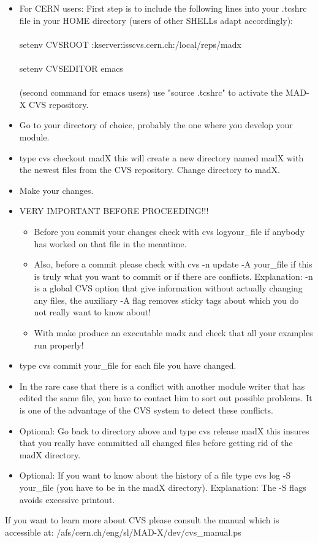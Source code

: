 \begin{itemize}
\begin{itemize}
	\item  For CERN users: First step is to include the following lines into your .tcshrc file in your HOME directory (users of other SHELLs adapt accordingly): 
\\
\\
 setenv CVSROOT :kserver:isscvs.cern.ch:/local/reps/madx 
 \\
 \\
 setenv CVSEDITOR emacs 
 \\
 \\
 (second command for emacs users) use "source .tcshrc" to activate the MAD-X CVS repository. 
	\item  Go to your directory of choice, probably the one where you develop your module. 
	\item  type cvs checkout madX this will create a new directory named madX with the newest files from the CVS repository. Change directory to madX. 
	\item  Make your changes. 
	\item VERY IMPORTANT BEFORE PROCEEDING!!! 
\begin{itemize}
	\item  Before you commit your changes check with cvs logyour\_file if anybody has worked on that file in the meantime. 
	\item  Also, before a commit please check with cvs -n update -A your\_file if this is truly what you want to commit or if there are conflicts. Explanation: -n is a global CVS option that give information without actually changing any files, the auxiliary -A flag removes sticky tags about which you do not really want to know about! 
	\item  With make produce an executable madx and check that all your examples run properly! 
\end{itemize}
	\item  type cvs commit your\_file for each file you have changed.  
	\item  In the rare case that there is a conflict with another module writer that has edited the same file, you have to contact him to sort out possible problems. It is one of the advantage of the CVS system to detect these conflicts. 
	\item  Optional: Go back to directory above and type cvs release madX  this insures that you really have committed all changed files before getting rid of the madX directory. 
	\item  Optional: If you want to know about the history of a file type cvs log -S your\_file (you have to be in the madX directory). Explanation: The -S flags avoids excessive printout.   
\end{itemize}  If you want to learn more about CVS please consult the manual which is accessible at: /afs/cern.ch/eng/sl/MAD-X/dev/cvs\_manual.ps  


\end{itemize}
